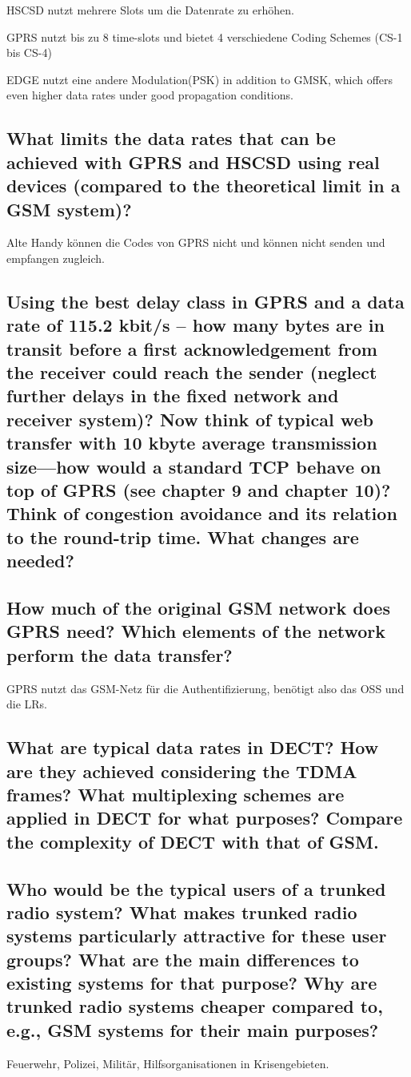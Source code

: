 HSCSD nutzt mehrere Slots um die Datenrate zu erhöhen.

GPRS nutzt bis zu 8 time-slots und bietet 4 verschiedene Coding Schemes (CS-1 bis CS-4)

EDGE nutzt eine andere Modulation(PSK) in addition to GMSK, which offers even higher data rates under good propagation conditions. 


\subsection{What limits the data rates that can be achieved with GPRS and HSCSD using real devices (compared to the theoretical limit in a GSM system)?}
Alte Handy können die Codes von GPRS nicht und können nicht senden und empfangen zugleich.

\subsection{Using the best delay class in GPRS and a data rate of 115.2 kbit/s – how many bytes are in transit before a first acknowledgement from the receiver could reach the sender (neglect further delays in the fixed network and receiver system)? Now think of typical web transfer with 10 kbyte average transmission size—how would a standard TCP behave on top of GPRS (see chapter 9 and chapter 10)? Think of congestion avoidance and its relation to the round-trip time. What changes are needed?}

\subsection{How much of the original GSM network does GPRS need? Which elements of the network perform the data transfer?}
GPRS nutzt das GSM-Netz für die Authentifizierung, benötigt also das OSS und die LRs. 

\subsection{What are typical data rates in DECT? How are they achieved considering the TDMA frames? What multiplexing schemes are applied in DECT for what purposes? Compare the complexity of DECT with that of GSM.}

\subsection{Who would be the typical users of a trunked radio system? What makes trunked radio systems particularly attractive for these user groups? What are the main differences to existing systems for that purpose? Why are trunked radio systems cheaper compared to, e.g., GSM systems for their main purposes?}
Feuerwehr, Polizei, Militär, Hilfsorganisationen in Krisengebieten.

